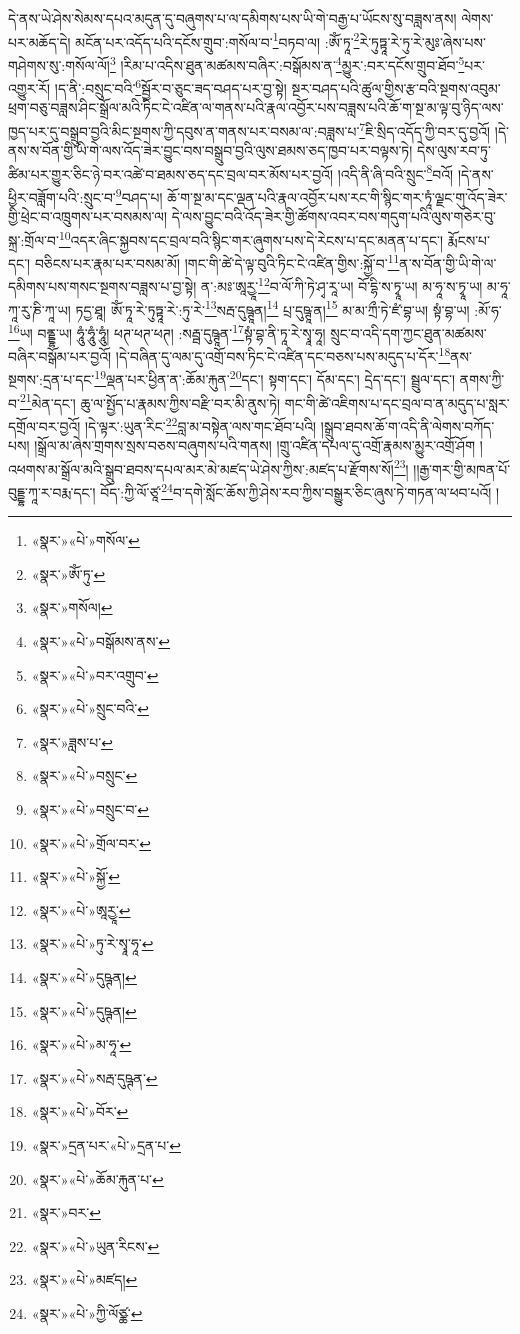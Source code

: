 དེ་ནས་ཡེ་ཤེས་སེམས་དཔའ་མདུན་དུ་བཞུགས་པ་ལ་དམིགས་པས་ཡི་གེ་བརྒྱ་པ་ཡོངས་སུ་བཟླས་ནས། ལེགས་པར་མཆོད་དེ། མངོན་པར་འདོད་པའི་དངོས་གྲུབ་:གསོལ་བ་\footnote{«སྣར་»«པེ་»གསོལ་}བཏབ་ལ། :ཨོཾ་ཏཱ་\footnote{«སྣར་»ཨོཾ་ཏུ་}རེ་ཏུཏྟཱ་རེ་ཏུ་རེ་མུཿ་ཞེས་པས་གཤེགས་སུ་:གསོལ་ལོ།\footnote{«སྣར་»གསོལ།} །རིམ་པ་འདིས་ཐུན་མཚམས་བཞིར་:བསྒོམས་ན་\footnote{«སྣར་»«པེ་»བསྒོམས་ནས་}མྱུར་:བར་དངོས་གྲུབ་ཐོབ་\footnote{«སྣར་»«པེ་»བར་འགྲུབ་}པར་འགྱུར་རོ། །ད་ནི་:བསྲུང་བའི་\footnote{«སྣར་»«པེ་»སྲུང་བའི་}སྦྱོར་བ་ཅུང་ཟད་བཤད་པར་བྱ་སྟེ། སྔར་བཤད་པའི་ཚུལ་གྱིས་རྩ་བའི་སྔགས་འབུམ་ཕྲག་བཅུ་བཟླས་ཤིང་སྒྲོལ་མའི་ཏིང་ངེ་འཛིན་ལ་གནས་པའི་རྣལ་འབྱོར་པས་བཟླས་པའི་ཆོ་ག་སྔ་མ་ལྟ་བུ་ཉིད་ལས་ཁྱད་པར་དུ་བསྒྲུབ་བྱའི་མིང་སྔགས་ཀྱི་དབུས་ན་གནས་པར་བསམ་ལ་:བཟླས་པ་\footnote{«སྣར་»ཟླས་པ་}ཇི་སྲིད་འདོད་ཀྱི་བར་དུ་བྱའོ། །དེ་ནས་ས་བོན་གྱི་ཡི་གེ་ལས་འོད་ཟེར་བྱུང་བས་བསྒྲུབ་བྱའི་ལུས་ཐམས་ཅད་ཁྱབ་པར་བལྟས་ཏེ། དེས་ལུས་རབ་ཏུ་ཚིམ་པར་གྱུར་ཅིང་ཉེ་བར་འཚེ་བ་ཐམས་ཅད་དང་བྲལ་བར་མོས་པར་བྱའོ། །འདི་ནི་ཞི་བའི་སྲུང་\footnote{«སྣར་»«པེ་»བསྲུང་}བའོ། །དེ་ནས་ཕྱིར་བཟློག་པའི་:སྲུང་བ་\footnote{«སྣར་»«པེ་»བསྲུང་བ་}བཤད་པ། ཆོ་ག་སྔ་མ་དང་ལྡན་པའི་རྣལ་འབྱོར་པས་རང་གི་སྙིང་གར་ཏཱཾ་ལྗང་གུ་འོད་ཟེར་གྱི་ཕྲེང་བ་འཁྲུགས་པར་བསམས་ལ། དེ་ལས་བྱུང་བའི་འོད་ཟེར་གྱི་ཚོགས་འབར་བས་གདུག་པའི་ལུས་གཅེར་བུ་སྐྲ་:གྲོལ་བ་\footnote{«སྣར་»«པེ་»གྲོལ་བར་}འདར་ཞིང་སྐྱབས་དང་བྲལ་བའི་སྙིང་གར་ཞུགས་པས་དེ་རེངས་པ་དང་མནན་པ་དང་། རྨོངས་པ་དང་། བཅིངས་པར་རྣམ་པར་བསམ་མོ། །གང་གི་ཚེ་དེ་ལྟ་བུའི་ཏིང་ངེ་འཛིན་གྱིས་:སྐྱོ་བ་\footnote{«སྣར་»«པེ་»སྐྱོ་}ན་ས་བོན་གྱི་ཡི་གེ་ལ་དམིགས་པས་གསང་སྔགས་བཟླས་པ་བྱ་སྟེ། ན་:མཿ་ཨཱརྱཱ་\footnote{«སྣར་»«པེ་»ཨཱརྱཱ་}བ་ལོ་ཀི་ཏེ་ཤྭ་རཱ་ཡ། བོ་དྷི་ས་ཏྭཱ་ཡ། མ་ཧཱ་ས་ཏྭཱ་ཡ། མ་ཧཱ་ཀཱ་རུ་ཎི་ཀཱ་ཡ། ཏདྱ་ཐཱ། ཨོཾ་ཏཱ་རེ་ཏུཏྟཱ་རེ་:ཏུ་རེ་\footnote{«སྣར་»«པེ་»ཏུ་རེ་སྭཱ་ཧཱ་}སརྦ་དུཥྚཱན།\footnote{«སྣར་»«པེ་»དུཥྚན།} པྲ་དུཥྚཱ་ན།\footnote{«སྣར་»«པེ་»དུཥྚན།} མ་མ་ཀྲྀ་ཏེ་ཛཾ་བྷ་ཡ། སྟཾ་བྷ་ཡ། :མོ་ཧ་\footnote{«སྣར་»«པེ་»མ་ཧཱ་}ཡ། བནྡྷ་ཡ། ཧཱུཾ་ཧཱུཾ་ཧཱུཾ། ཕཊ་ཕཊ་ཕཊ། :སརྦྦ་དུཥྚཱན་\footnote{«སྣར་»«པེ་»སརྦ་དུཥྚན་}སྟཾ་བྷ་ནི་ཏཱ་རེ་སྭཱ་ཧཱ། སྲུང་བ་འདི་དག་ཀྱང་ཐུན་མཚམས་བཞིར་བསྒོམ་པར་བྱའོ། །དེ་བཞིན་དུ་ལམ་དུ་འགྲོ་བས་ཏིང་ངེ་འཛིན་དང་བཅས་པས་མདུད་པ་དོར་\footnote{«སྣར་»«པེ་»བོར་}ནས་སྔགས་:དྲན་པ་དང་\footnote{«སྣར་»དྲན་པར་«པེ་»དྲན་པ་}ལྡན་པར་ཕྱིན་ན་:ཆོམ་རྐུན་\footnote{«སྣར་»«པེ་»ཆོམ་རྐུན་པ་}དང་། སྟག་དང་། དོམ་དང་། དྲེད་དང་། སྦྲུལ་དང་། ནགས་ཀྱི་བ་\footnote{«སྣར་»བར་}མེན་དང་། ཆུ་ལ་སྤྱོད་པ་རྣམས་ཀྱིས་བརྫི་བར་མི་ནུས་ཏེ། གང་གི་ཚེ་འཇིགས་པ་དང་བྲལ་བ་ན་མདུད་པ་སླར་དགྲོལ་བར་བྱའོ། །དེ་ལྟར་:ཡུན་རིང་\footnote{«སྣར་»«པེ་»ཡུན་རིངས་}བླ་མ་བསྟེན་ལས་གང་ཐོབ་པའི། །སྒྲུབ་ཐབས་ཆོ་ག་འདི་ནི་ལེགས་བཀོད་པས། །སྒྲོལ་མ་ཞེས་གྲགས་སྲས་བཅས་བཞུགས་པའི་གནས། །གྲུ་འཛིན་དཔལ་དུ་འགྲོ་རྣམས་མྱུར་འགྲོ་ཤོག །འཕགས་མ་སྒྲོལ་མའི་སྒྲུབ་ཐབས་དཔལ་མར་མེ་མཛད་ཡེ་ཤེས་ཀྱིས་:མཛད་པ་རྫོགས་སོ།\footnote{«སྣར་»«པེ་»མཛད།}། །།རྒྱ་གར་གྱི་མཁན་པོ་བུདྡྷ་ཀཱ་ར་བརྨ་དང་། བོད་:ཀྱི་ལོ་ཙཱ་\footnote{«སྣར་»«པེ་»ཀྱི་ལོཙྪ་}བ་དགེ་སློང་ཆོས་ཀྱི་ཤེས་རབ་ཀྱིས་བསྒྱུར་ཅིང་ཞུས་ཏེ་གཏན་ལ་ཕབ་པའོ། ། 